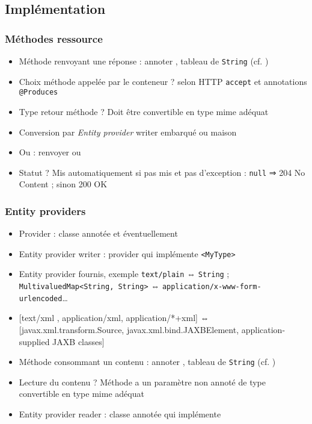 \documentclass[english, french]{beamer}
\begin{document}
\subsection{Implémentation}
\begin{frame}
	\frametitle{Méthodes ressource}
	\begin{itemize}
		\item Méthode renvoyant une réponse : annoter , tableau de \texttt{String} (cf. )
		\item Choix méthode appelée par le conteneur ? \pause selon HTTP \texttt{accept} et annotations \texttt{@Produces} \pause
		\item Type retour méthode ? \pause Doit être convertible en type mime adéquat \pause
		\item Conversion par \emph{Entity provider} \og{}writer\fg{} embarqué ou maison
		\item Ou : renvoyer  {\tiny ou }
		\item Statut ? \pause Mis automatiquement si pas mis {\tiny et pas d’exception} : \texttt{null} ⇒ 204 No Content ; sinon 200 OK
	\end{itemize}
\end{frame}

\begin{frame}
	\frametitle{Entity providers}
	\begin{itemize}
		\item Provider : classe annotée  et {\tiny éventuellement} 
		\item Entity provider \og{}writer\fg{} : provider qui implémente \texttt{<MyType>}
		\item Entity provider fournis, exemple \texttt{text/plain} ⇔ \texttt{String} ; \texttt{MultivaluedMap<String, String>} ⇔ \texttt{application/x-www-form-urlencoded}…
		\item{} {\tiny [text/xml , application/xml, application/*+xml] ⇔ [javax.xml.transform.Source, javax.xml.bind.JAXBElement, application-supplied JAXB classes]} %
		\item Méthode consommant un contenu : annoter , tableau de \texttt{String} (cf. )
		\item Lecture du contenu ? \pause Méthode a un paramètre non annoté de type convertible en type mime adéquat \pause
		\item Entity provider \og{}reader\fg{} : classe annotée  qui implémente 
	\end{itemize}
\end{frame}
\end{document}
